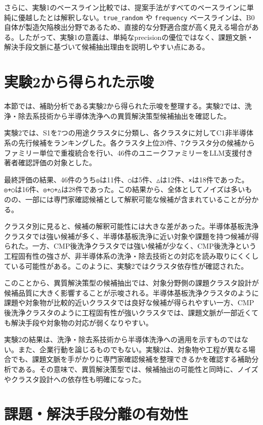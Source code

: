 さらに、実験1のベースライン比較では、提案手法がすべてのベースラインに単純に優越したとは解釈しない。\texttt{true\_random} や \texttt{frequency} ベースラインは、B0自体が製造欠陥検出分野であるため、直接的な分野適合度が高く見える場合がある。したがって、実験1の意義は、単純なprecisionの優位ではなく、課題文脈・解決手段文脈に基づいて候補抽出理由を説明しやすい点にある。

\section{実験2から得られた示唆}

本節では、補助分析である実験2から得られた示唆を整理する。実験2では、洗浄・除去系技術から半導体洗浄への異質解決策型候補抽出を確認した。

実験2では、S1を7つの用途クラスタに分類し、各クラスタに対してC1非半導体系の先行候補をランキングした。各クラスタ上位20件、7クラスタ分の候補からファミリー単位で重複統合を行い、46件のユニークファミリーをLLM支援付き著者確認評価の対象とした。

最終評価の結果、46件のうち\texttt{◎}は11件、\texttt{○}は5件、\texttt{△}は12件、\texttt{×}は18件であった。\texttt{◎+○}は16件、\texttt{◎+○+△}は28件であった。この結果から、全体としてノイズは多いものの、一部には専門家確認候補として解釈可能な候補が含まれていることが分かる。

クラスタ別に見ると、候補の解釈可能性には大きな差があった。半導体基板洗浄クラスタでは強い候補が多く、半導体基板洗浄に近い対象や課題を持つ候補が得られた。一方、CMP後洗浄クラスタでは強い候補が少なく、CMP後洗浄という工程固有性の強さが、非半導体系の洗浄・除去技術との対応を読み取りにくくしている可能性がある。このように、実験2ではクラスタ依存性が確認された。

このことから、異質解決策型の候補抽出では、対象分野側の課題クラスタ設計が候補品質に大きく影響することが示唆される。半導体基板洗浄クラスタのように課題や対象物が比較的近いクラスタでは良好な候補が得られやすい一方、CMP後洗浄クラスタのように工程固有性が強いクラスタでは、課題文脈が一部近くても解決手段や対象物の対応が弱くなりやすい。

実験2の結果は、洗浄・除去系技術から半導体洗浄への適用を示すものではない。また、企業行動を論じるものでもない。実験2は、対象物や工程が異なる場合でも、課題文脈を手がかりに専門家確認候補を整理できるかを確認する補助分析である。その意味で、異質解決策型では、候補抽出の可能性と同時に、ノイズやクラスタ設計への依存性も明確になった。

\section{課題・解決手段分離の有効性}

